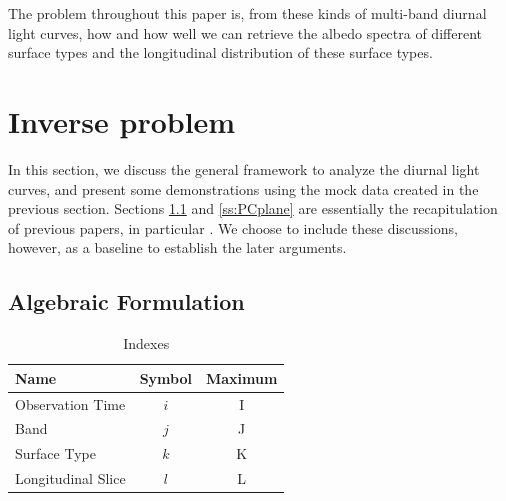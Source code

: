 \documentclass[iop,numberedappendix,apj,]{emulateapj}
\begin{document}
The problem throughout this paper is, from these kinds of multi-band diurnal light curves, how and how well we can retrieve the albedo spectra of different surface types and the longitudinal distribution of these surface types. 


\section{Inverse problem}
\label{s:frame}

In this section, we discuss the general framework to analyze the diurnal light curves, and present some demonstrations using the mock data created in the previous section. 
Sections \ref{ss:model} and \ref{ss:PCplane} are essentially the recapitulation of previous papers, in particular \citet{Cowan2013} \citep[but see also][]{Cowan2009,Cowan2011,Fujii2010,Fujii2011}.  
We choose to include these discussions, however, as a baseline to establish the later arguments. 

\subsection{Algebraic Formulation}
\label{ss:model}


\begin{table}[b]
\caption{Indexes}
\begin{center}
\begin{tabular}{lcc} \hline \hline
Name & Symbol & Maximum \\ \hline
Observation Time & $i$ & I \\
Band & $j$ & J  \\
Surface Type & $k$ & K  \\
Longitudinal Slice  & $l$ & L \\ \hline
\end{tabular}
\end{center}
\label{tab:index}
\end{table}%
\end{document}
